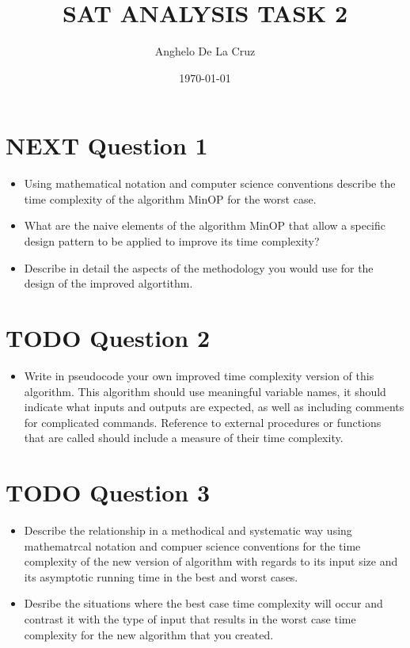 \documentclass[11pt]{article}
\author{Anghelo De La Cruz}
\date{\today}
\title{SAT ANALYSIS TASK 2}
\begin{document}
\maketitle
\tableofcontents



\section{{\bfseries\sffamily NEXT} Question 1}
\label{sec-1}

\begin{itemize}
\item Using mathematical notation and computer science conventions
describe the time complexity of the algorithm MinOP for the worst
case.
\item What are the naive elements of the algorithm MinOP that allow a
specific design pattern to be applied to improve its time
complexity?
\item Describe in detail the aspects of the methodology you would use for
the design of the improved algortithm.
\end{itemize}

\section{{\bfseries\sffamily TODO} Question 2}
\label{sec-2}

\begin{itemize}
\item Write in pseudocode your own improved time complexity version of
this algorithm. This algorithm should use meaningful variable names,
it should indicate what inputs and outputs are expected, as well as
including comments for complicated commands. Reference to external
procedures or functions that are called should include a measure of
their time complexity.
\end{itemize}


\section{{\bfseries\sffamily TODO} Question 3}
\label{sec-3}

\begin{itemize}
\item Describe the relationship in a methodical and systematic way using
mathematrcal notation and compuer science conventions for the time
complexity of the new version of algorithm with regards to its input
size and its asymptotic running time in the best and worst cases.
\item Desribe the situations where the best case time complexity will
occur and contrast it with the type of input that results in the
worst case time complexity for the new algorithm that you created.
\end{itemize}
\end{document}

